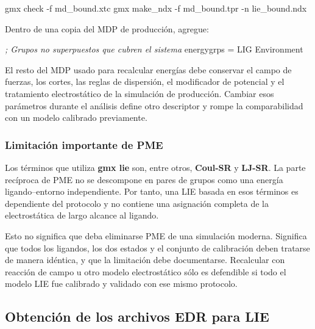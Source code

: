 \documentclass[
  spanish,
  11pt,
  a4paper]{article}
\newenvironment{Shaded}{\begin{snugshade}}{\end{snugshade}}
\newcommand{\AttributeTok}[1]{\textcolor[rgb]{0.13,0.29,0.53}{#1}}
\newcommand{\CommentTok}[1]{\textcolor[rgb]{0.56,0.35,0.01}{\textit{#1}}}
\newcommand{\DataTypeTok}[1]{\textcolor[rgb]{0.13,0.29,0.53}{#1}}
\newcommand{\ExtensionTok}[1]{#1}
\newcommand{\NormalTok}[1]{#1}
\newcommand{\OtherTok}[1]{\textcolor[rgb]{0.56,0.35,0.01}{#1}}
\newcommand{\StringTok}[1]{\textcolor[rgb]{0.31,0.60,0.02}{#1}}
\begin{document}
\begin{Shaded}
\begin{Highlighting}[]
\ExtensionTok{gmx}\NormalTok{ check }\AttributeTok{{-}f}\NormalTok{ md\_bound.xtc}
\ExtensionTok{gmx}\NormalTok{ make\_ndx }\AttributeTok{{-}f}\NormalTok{ md\_bound.tpr }\AttributeTok{{-}n}\NormalTok{ lie\_bound.ndx}
\end{Highlighting}
\end{Shaded}

Dentro de una copia del MDP de producción, agregue:

\begin{Shaded}
\begin{Highlighting}[]
\CommentTok{; Grupos no superpuestos que cubren el sistema}
\DataTypeTok{energygrps }\OtherTok{=}\StringTok{ LIG Environment}
\end{Highlighting}
\end{Shaded}

El resto del MDP usado para recalcular energías debe conservar el campo
de fuerzas, los cortes, las reglas de dispersión, el modificador de
potencial y el tratamiento electrostático de la simulación de
producción. Cambiar esos parámetros durante el análisis define otro
descriptor y rompe la comparabilidad con un modelo calibrado
previamente.

\subsubsection{Limitación importante de
PME}\label{limitaciuxf3n-importante-de-pme}

Los términos que utiliza \textbf{gmx lie} son, entre otros,
\textbf{Coul-SR} y \textbf{LJ-SR}. La parte recíproca de PME no se
descompone en pares de grupos como una energía ligando--entorno
independiente. Por tanto, una LIE basada en esos términos es dependiente
del protocolo y no contiene una asignación completa de la electrostática
de largo alcance al ligando.

Esto no significa que deba eliminarse PME de una simulación moderna.
Significa que todos los ligandos, los dos estados y el conjunto de
calibración deben tratarse de manera idéntica, y que la limitación debe
documentarse. Recalcular con reacción de campo u otro modelo
electrostático sólo es defendible si todo el modelo LIE fue calibrado y
validado con ese mismo protocolo.

\subsection{Obtención de los archivos EDR para
LIE}\label{obtenciuxf3n-de-los-archivos-edr-para-lie}
\end{document}
